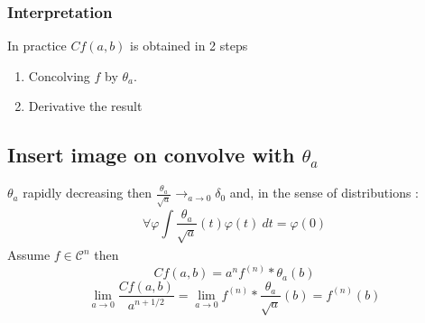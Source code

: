 \subsubsection{Interpretation}
In practice $ Cf(a,b)  $ is obtained in 2 steps 
\begin{enumerate}
    \item Concolving $ f $ by $ \theta_a $. 
    \item Derivative the result
\end{enumerate}
\subsection{Insert image on convolve with $ \theta_a  $}
\label{subsec:Insert image on convolve with $ \theta_a  $}

$ \theta_a  $ rapidly decreasing then $ \frac{ \theta_a }{ \sqrt{a}  } \to_{a \to 0} \delta_0  $ and, in the
sense of distributions : 
\[
    \forall \varphi \int\limits_{ }^{ } \frac{ \theta_a }{ \sqrt{a}  } (t) \varphi(t) \ dt
    = \varphi(0) 
\]
Assume $ f \in \mathscr{ C } ^n  $ then 
\[
    Cf(a,b) = a^n f^{(n)} * \theta_a (b) 
\]
\[
    \lim_{a\to 0} \frac{ Cf(a,b)  }{ a^{n+1/2}  } = \lim_{a\to0}f^{(n)} * \frac{ \theta_a
    }{ \sqrt{a}  } (b) = f^{(n)}(b)
\]




















